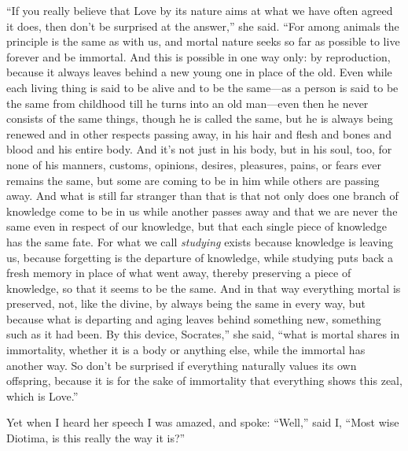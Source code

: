 “If you really believe that Love by its nature aims at what we have
often  agreed it does, then don’t be surprised at the answer,”
she said. “For among animals the principle is the same as with us, and
mortal nature seeks so far as possible to live forever and be immortal.
And this is possible in one way only: by reproduction, because it always
leaves behind a new young one in place of the old. Even while each
living thing is said to be alive and to be the same---as a person is
said to be the same from childhood till he turns into an old man---even
then he never consists of the same things, though he is called the same,
but he is always being renewed and  in other respects passing
away, in his hair and flesh and bones and blood and his entire body. And
it’s not just in his body, but in his soul, too, for none of his
manners, customs, opinions, desires, pleasures, pains, or fears ever
remains the same, but some are coming to be in him while others are
passing away. And what is still far stranger than that is that not only
 does one branch of knowledge come to be in us while
another passes away and that we are never the same even in respect of
our knowledge, but that each single piece of knowledge has the same
fate. For what we call {\em studying} exists because knowledge is
leaving us, because forgetting is the departure of knowledge, while
studying puts back a fresh memory in place of what went away, thereby
preserving a piece of knowledge, so that it seems to be the same. And in
that way everything mortal is preserved, not, like the divine, by always
being the same in every way, but because  what is departing and
aging leaves behind something new, something such as it had been. By
this device, Socrates,” she said, “what is mortal shares in immortality,
whether it is a body or anything else, while the immortal has another
way. So don’t be surprised if everything naturally values its own
offspring, because it is for the sake of immortality that everything
shows this zeal, which is Love.”

Yet when I heard her speech I was amazed, and spoke: “Well,” said I,
 “Most wise Diotima, is this really the way it is?”

